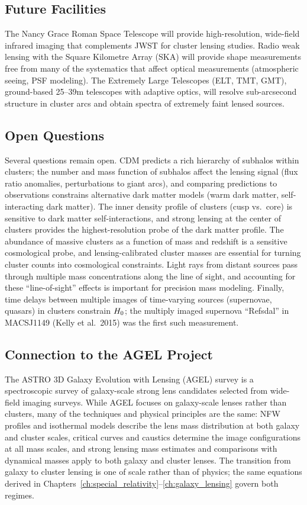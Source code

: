 \subsection{Future Facilities}

The Nancy Grace Roman Space Telescope will provide high-resolution,
wide-field infrared imaging that complements JWST for cluster
lensing studies.  Radio weak lensing with the Square Kilometre Array
(SKA) will provide shape measurements free from many of the
systematics that affect optical measurements (atmospheric seeing,
PSF modeling).  The Extremely Large Telescopes (ELT, TMT, GMT),
ground-based 25--39m telescopes with adaptive optics, will resolve
sub-arcsecond structure in cluster arcs and obtain spectra of
extremely faint lensed sources.

\subsection{Open Questions}

Several questions remain open.  CDM predicts a rich hierarchy of
subhalos within clusters; the number and mass function of subhalos
affect the lensing signal (flux ratio anomalies, perturbations to
giant arcs), and comparing predictions to observations constrains
alternative dark matter models (warm dark matter, self-interacting
dark matter).  The inner density profile of clusters (cusp vs.\
core) is sensitive to dark matter self-interactions, and strong
lensing at the center of clusters provides the highest-resolution
probe of the dark matter profile.  The abundance of massive clusters
as a function of mass and redshift is a sensitive cosmological
probe, and lensing-calibrated cluster masses are essential for
turning cluster counts into cosmological constraints.  Light rays
from distant sources pass through multiple mass concentrations along
the line of sight, and accounting for these ``line-of-sight''
effects is important for precision mass modeling.  Finally, time
delays between multiple images of time-varying sources (supernovae,
quasars) in clusters constrain $H_0$; the multiply imaged
supernova ``Refsdal'' in MACSJ1149 (Kelly et al.\ 2015) was the
first such measurement.

\subsection{Connection to the AGEL Project}

The ASTRO 3D Galaxy Evolution with Lensing (AGEL) survey is a
spectroscopic survey of galaxy-scale strong lens candidates selected
from wide-field imaging surveys.  While AGEL focuses on galaxy-scale
lenses rather than clusters, many of the techniques and physical
principles are the same: NFW profiles and isothermal models describe
the lens mass distribution at both galaxy and cluster scales,
critical curves and caustics determine the image configurations at
all mass scales, and strong lensing mass estimates and comparisons
with dynamical masses apply to both galaxy and cluster lenses.  The
transition from galaxy to cluster lensing is one of scale rather
than of physics; the same equations derived in
Chapters~\ref{ch:special_relativity}--\ref{ch:galaxy_lensing} govern both regimes.


